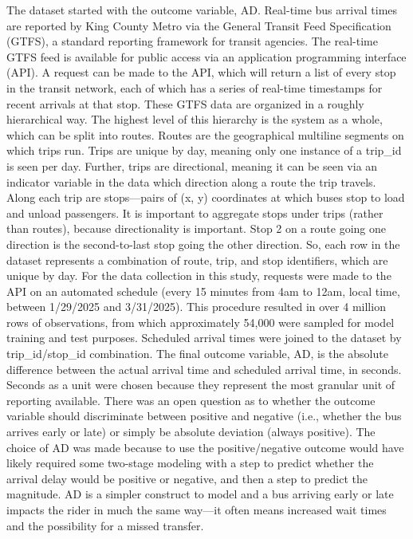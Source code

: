 \documentclass[
  12pt,
]{article}
\begin{document}
The dataset started with the outcome variable, AD. Real-time bus arrival
times are reported by King County Metro via the General Transit Feed
Specification (GTFS), a standard reporting framework for transit
agencies. The real-time GTFS feed is available for public access via an
application programming interface (API). A request can be made to the
API, which will return a list of every stop in the transit network, each
of which has a series of real-time timestamps for recent arrivals at
that stop. These GTFS data are organized in a roughly hierarchical way.
The highest level of this hierarchy is the system as a whole, which can
be split into routes. Routes are the geographical multiline segments on
which trips run. Trips are unique by day, meaning only one instance of a
trip\_id is seen per day. Further, trips are directional, meaning it can
be seen via an indicator variable in the data which direction along a
route the trip travels. Along each trip are stops---pairs of (x, y)
coordinates at which buses stop to load and unload passengers. It is
important to aggregate stops under trips (rather than routes), because
directionality is important. Stop 2 on a route going one direction is
the second-to-last stop going the other direction. So, each row in the
dataset represents a combination of route, trip, and stop identifiers,
which are unique by day. For the data collection in this study, requests
were made to the API on an automated schedule (every 15 minutes from 4am
to 12am, local time, between 1/29/2025 and 3/31/2025). This procedure
resulted in over 4 million rows of observations, from which
approximately 54,000 were sampled for model training and test purposes.
Scheduled arrival times were joined to the dataset by trip\_id/stop\_id
combination. The final outcome variable, AD, is the absolute difference
between the actual arrival time and scheduled arrival time, in seconds.
Seconds as a unit were chosen because they represent the most granular
unit of reporting available. There was an open question as to whether
the outcome variable should discriminate between positive and negative
(i.e., whether the bus arrives early or late) or simply be absolute
deviation (always positive). The choice of AD was made because to use
the positive/negative outcome would have likely required some two-stage
modeling with a step to predict whether the arrival delay would be
positive or negative, and then a step to predict the magnitude. AD is a
simpler construct to model and a bus arriving early or late impacts the
rider in much the same way---it often means increased wait times and the
possibility for a missed transfer.
\end{document}
